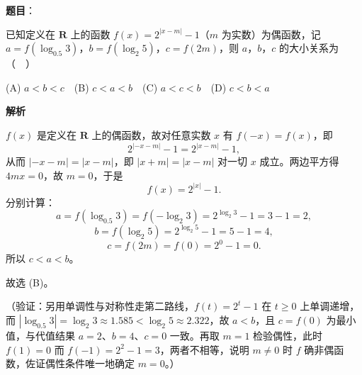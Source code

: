 \begin{answer}

\textbf{题目}：

已知定义在 \(\mathbf{R}\) 上的函数 \(f(x)=2^{|x-m|}-1\)（\(m\) 为实数）为偶函数，记 \(a=f(\log_{0.5}3)\)，\(b=f(\log_2 5)\)，\(c=f(2m)\)，则 \(a\)，\(b\)，\(c\) 的大小关系为（　）

(A) \(a<b<c\)　(B) \(c<a<b\)　(C) \(a<c<b\)　(D) \(c<b<a\)

\textbf{解析}

\(f(x)\) 是定义在 \(\mathbf{R}\) 上的偶函数，故对任意实数 \(x\) 有 \(f(-x)=f(x)\)，即
\nopagebreak[4]
\[
2^{|-x-m|}-1=2^{|x-m|}-1,
\]
从而 \(|-x-m|=|x-m|\)，即 \(|x+m|=|x-m|\) 对一切 \(x\) 成立。两边平方得 \(4mx=0\)，故 \(m=0\)，于是
\nopagebreak[4]
\[
f(x)=2^{|x|}-1.
\]
分别计算：
\nopagebreak[4]
\[
a=f(\log_{0.5}3)=f(-\log_2 3)=2^{\log_2 3}-1=3-1=2,
\]
\nopagebreak[4]
\[
b=f(\log_2 5)=2^{\log_2 5}-1=5-1=4,
\]
\nopagebreak[4]
\[
c=f(2m)=f(0)=2^0-1=0.
\]
所以 \(c<a<b\)。

故选 (B)。

（验证：另用单调性与对称性走第二路线，\(f(t)=2^t-1\) 在 \(t\geqslant 0\) 上单调递增，而 \(|\log_{0.5}3|=\log_2 3\approx 1.585<\log_2 5\approx 2.322\)，故 \(a<b\)，且 \(c=f(0)\) 为最小值，与代值结果 \(a=2\)、\(b=4\)、\(c=0\) 一致。再取 \(m=1\) 检验偶性，此时 \(f(1)=0\) 而 \(f(-1)=2^{2}-1=3\)，两者不相等，说明 \(m\neq 0\) 时 \(f\) 确非偶函数，佐证偶性条件唯一地确定 \(m=0\)。）


\end{answer}
